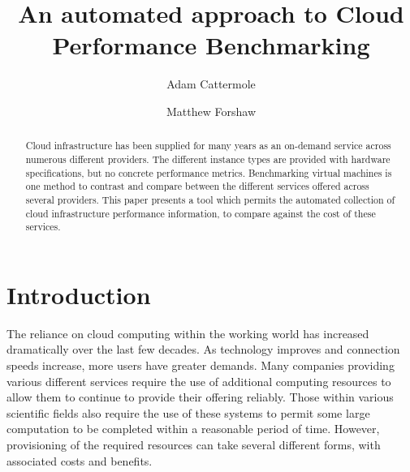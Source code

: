 \documentclass{llncs}
\begin{document}
%
\title{An automated approach to Cloud Performance Benchmarking}
%
%
\author{Adam Cattermole \and Matthew Forshaw}
%
%
%

\maketitle              %

\begin{abstract}
Cloud infrastructure has been supplied for many years as an on-demand service across numerous different providers. The different instance types are provided with hardware specifications, but no concrete performance metrics. Benchmarking virtual machines is one method to contrast and compare between the different services offered across several providers. %
This paper presents a tool which permits the automated collection of cloud infrastructure performance information, to compare against the cost of these services.
\end{abstract}
%


\section{Introduction}\label{sec:introduction}

The reliance on cloud computing within the working world has increased dramatically over the last few decades. As technology improves and connection speeds increase, more users have greater demands. Many companies providing various different services require the use of additional computing resources to allow them to continue to provide their offering reliably. Those within various scientific fields also require the use of these systems to permit some large computation to be completed within a reasonable period of time. However, provisioning of the required resources can take several different forms, with associated costs and benefits.
\end{document}
